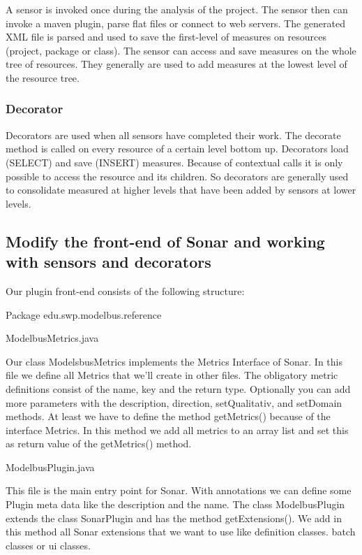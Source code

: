 A sensor is invoked once during the analysis of the project. The sensor then can invoke a maven plugin, parse flat files or connect to web servers. The generated XML file is parsed and used to save the first-level of measures on resources (project, package or class). The sensor can access and save measures on the whole tree of resources. They generally are used to add measures at the lowest level of the resource tree.

\subsubsection{Decorator}

Decorators are used when all sensors have completed their work. The decorate method is called on every resource of a certain level bottom up. Decorators load (SELECT) and save (INSERT) measures. Because of contextual calls it is only possible to access the resource and its children. So decorators are generally used to consolidate measured at higher levels that have been added by sensors at lower levels.

\subsection{Modify the front-end of Sonar and working with sensors and decorators}
Our plugin front-end consists of the following structure:

Package edu.swp.modelbus.reference

ModelbusMetrics.java

Our class ModelsbusMetrics implements the Metrics Interface of Sonar. In this file we define all Metrics that we'll create in other files. The obligatory metric definitions consist of the name, key and the return type. Optionally you can add more parameters with the description, direction, setQualitativ, and setDomain methods. At least we have to define the method getMetrics() because of the interface Metrics. In this method we add all metrics to an array list and set this as return value of the getMetrics() method.

ModelbusPlugin.java

This file is the main entry point for Sonar. With annotations we can define some Plugin meta data like the description and the name. The class ModelbusPlugin extends the class SonarPlugin and has the method getExtensions(). We add in this method all Sonar extensions that we want to use like definition classes. batch classes or ui classes.

